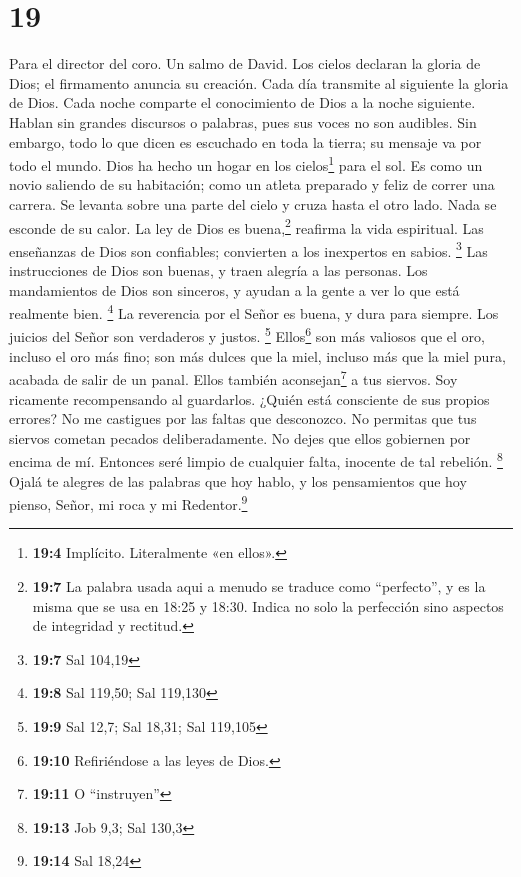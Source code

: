 \hypertarget{section-18}{%
\section{19}\label{section-18}}

Para el director del coro. Un salmo de David.  Los cielos
declaran la gloria de Dios; el firmamento anuncia su creación.
 Cada día transmite al siguiente la gloria de Dios. Cada
noche comparte el conocimiento de Dios a la noche siguiente.
 Hablan sin grandes discursos o palabras, pues sus voces
no son audibles.  Sin embargo, todo lo que dicen es
escuchado en toda la tierra; su mensaje va por todo el mundo. Dios ha
hecho un hogar en los cielos\footnote{\textbf{19:4} Implícito.
  Literalmente «en ellos».} para el sol.  Es como un novio
saliendo de su habitación; como un atleta preparado y feliz de correr
una carrera.  Se levanta sobre una parte del cielo y cruza
hasta el otro lado. Nada se esconde de su calor.  La ley
de Dios es buena,\footnote{\textbf{19:7} La palabra usada aqui a menudo
  se traduce como ``perfecto'', y es la misma que se usa en 18:25 y
  18:30. Indica no solo la perfección sino aspectos de integridad y
  rectitud.} reafirma la vida espiritual. Las enseñanzas de Dios son
confiables; convierten a los inexpertos en sabios. \footnote{\textbf{19:7}
  Sal 104,19}  Las instrucciones de Dios son buenas, y
traen alegría a las personas. Los mandamientos de Dios son sinceros, y
ayudan a la gente a ver lo que está realmente bien. \footnote{\textbf{19:8}
  Sal 119,50; Sal 119,130}  La reverencia por el Señor es
buena, y dura para siempre. Los juicios del Señor son verdaderos y
justos. \footnote{\textbf{19:9} Sal 12,7; Sal 18,31; Sal 119,105}
 Ellos\footnote{\textbf{19:10} Refiriéndose a las leyes
  de Dios.} son más valiosos que el oro, incluso el oro más fino; son
más dulces que la miel, incluso más que la miel pura, acabada de salir
de un panal.  Ellos también aconsejan\footnote{\textbf{19:11}
  O ``instruyen''} a tus siervos. Soy ricamente recompensando al
guardarlos.  ¿Quién está consciente de sus propios
errores? No me castigues por las faltas que desconozco. 
No permitas que tus siervos cometan pecados deliberadamente. No dejes
que ellos gobiernen por encima de mí. Entonces seré limpio de cualquier
falta, inocente de tal rebelión. \footnote{\textbf{19:13} Job 9,3; Sal
  130,3}  Ojalá te alegres de las palabras que hoy hablo,
y los pensamientos que hoy pienso, Señor, mi roca y mi
Redentor.\footnote{\textbf{19:14} Sal 18,24}


